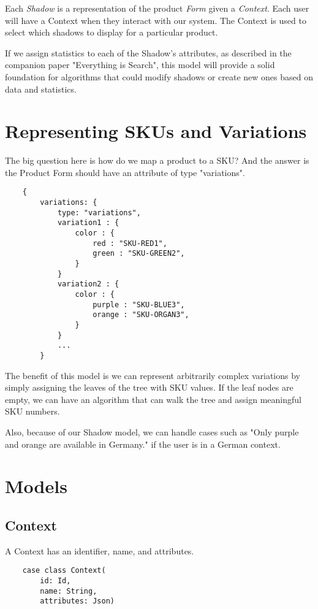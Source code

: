 \documentclass[11pt]{article}
\begin{document}
Each \emph{Shadow} is a representation of the product \emph{Form} given a \emph{Context}. Each user
will have a Context when they interact with our system. The Context is used
to select which shadows to display for a particular product.

If we assign statistics to each of the Shadow's attributes, as described in 
the companion paper "Everything is Search", this model will provide a solid
foundation for algorithms that could modify shadows or create new ones based on 
data and statistics.



\newpage
\section{Representing SKUs and Variations}
The big question here is how do we map a product to a SKU? And the answer is
the Product Form should have an attribute of type "variations".

\begin{lstlisting}
    {
        variations: {
            type: "variations",
            variation1 : {
                color : {
                    red : "SKU-RED1",
                    green : "SKU-GREEN2",
                }
            }
            variation2 : {
                color : {
                    purple : "SKU-BLUE3",
                    orange : "SKU-ORGAN3",
                }
            }
            ...
        }
\end{lstlisting}

The benefit of this model is we can represent arbitrarily complex variations 
by simply assigning the leaves of the tree with SKU values. If the leaf nodes are
empty, we can have an algorithm that can walk the tree and assign meaningful
SKU numbers.

Also, because of our Shadow model, we can handle cases such as "Only purple and orange
are available in Germany." if the user is in a German context.

\section{Models}

\subsection{Context}

A Context has an identifier, name, and attributes. 
\begin{lstlisting}
    case class Context(
        id: Id,
        name: String,
        attributes: Json)
\end{lstlisting}
\end{document}
